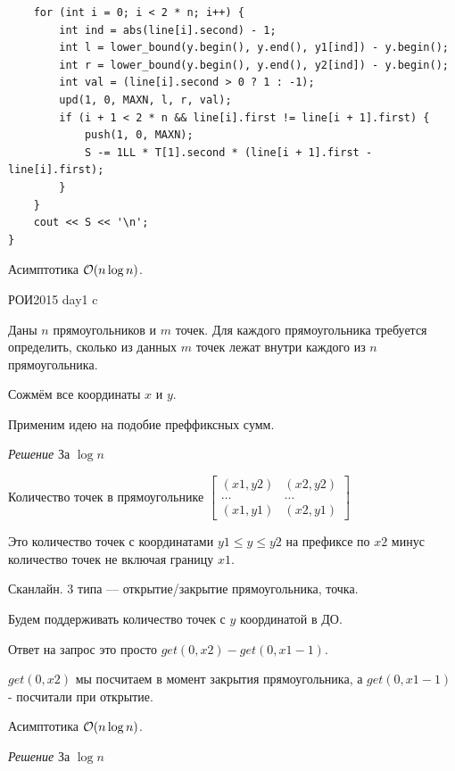 \begin{verbatim}
    for (int i = 0; i < 2 * n; i++) {
        int ind = abs(line[i].second) - 1;
        int l = lower_bound(y.begin(), y.end(), y1[ind]) - y.begin();
        int r = lower_bound(y.begin(), y.end(), y2[ind]) - y.begin();
        int val = (line[i].second > 0 ? 1 : -1);
        upd(1, 0, MAXN, l, r, val);
        if (i + 1 < 2 * n && line[i].first != line[i + 1].first) {
            push(1, 0, MAXN);
            S -= 1LL * T[1].second * (line[i + 1].first - line[i].first);
        }
    }
    cout << S << '\n';
}

\end{verbatim}


Асимптотика $\mathcal{O}(n \log n)$.



РОИ2015 day1 c

Даны $n$ прямоугольников и $m$ точек. Для каждого прямоугольника требуется определить, сколько из данных $m$ точек лежат внутри каждого из $n$ прямоугольника.

Сожмём все координаты $x$ и $y$.

Применим идею на подобие преффиксных сумм.

\down
\down

{\it Решение } За $\log n$

Количество точек в прямоугольнике $\begin{bmatrix}

(x1, y2) & (x2, y2)\\

\ldots   & \ldots\\

(x1, y1) & (x2, y1)

\end{bmatrix}$ 

Это количество точек с координатами $y1 \le y \le y2$ на префиксе по $x2$ минус количество точек не включая границу $x1$.

Сканлайн. 3 типа --- открытие/закрытие прямоугольника, точка.

Будем поддерживать количество точек с $y$ координатой в ДО.

Ответ на запрос это просто $get(0, x2) - get(0, x1 - 1)$.

$get(0, x2)$ мы посчитаем в момент закрытия прямоугольника, а $get(0, x1 - 1)$  - посчитали при открытие.


Асимптотика $\mathcal{O}(n \log n)$.

\down

{\it Решение } За $\log n$


